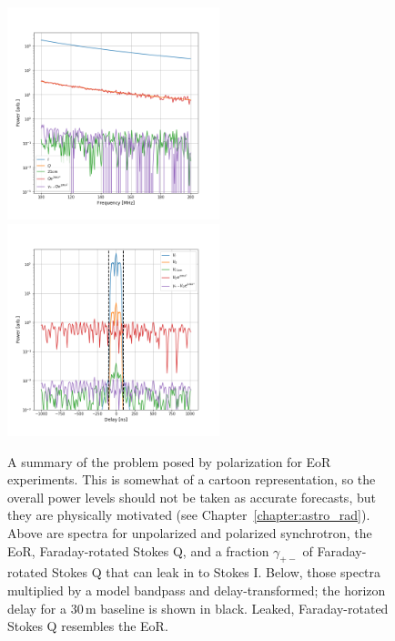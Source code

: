 \begin{figure}
\centering
\includegraphics[width=0.55\textwidth]{chapters/eor_window_theory/figures/vis_divBp_1pctDIleak_RM500.png}
\includegraphics[width=0.55\textwidth]{chapters/eor_window_theory/figures/dly_1pctDIleak_RM500.png}
\caption[A summary of the problem posed by polarization for EoR experiments.]{A summary of the problem posed by polarization for EoR experiments. This is somewhat of a cartoon representation, so the overall power levels should not be taken as accurate forecasts, but they are physically motivated (see Chapter~\ref{chapter:astro_rad}). Above are spectra for unpolarized and polarized synchrotron, the EoR, Faraday-rotated Stokes Q, and a fraction $\gamma_{+-}$ of Faraday-rotated Stokes Q that can leak in to Stokes I. Below, those spectra multiplied by a model bandpass and delay-transformed; the horizon delay for a 30\,m baseline is shown in black. Leaked, Faraday-rotated Stokes Q resembles the EoR.}
\label{fig:eor_window_theory_pol_problem}
\end{figure}

